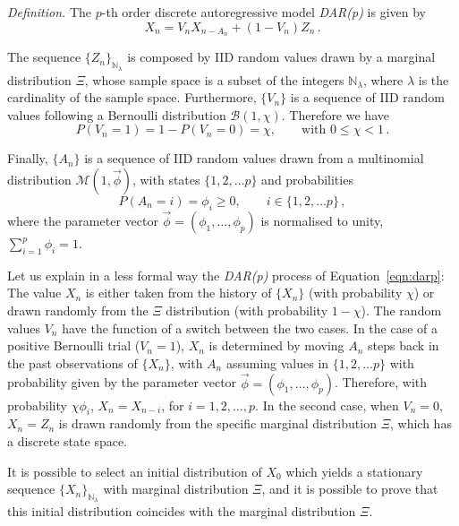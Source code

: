 \documentclass[12pt]{iopart}
\begin{document}
{\it Definition.}
The $p$-th order discrete autoregressive model \textit{DAR(p)} is given by
\begin{equation}
X_n=V_nX_{n-A_n}+(1-V_n)Z_n \label{eqn:darp}\,.
\end{equation}

The sequence $\lbrace Z_n \rbrace_{\mathbb{N}_\lambda}$ is composed by IID random values drawn by a marginal distribution $\Xi$, whose sample space is a subset of the integers $\mathbb{N}_\lambda$, where $\lambda$ is the cardinality of the sample space. Furthermore, $\lbrace V_n \rbrace$ is a sequence of IID random values following a Bernoulli distribution $\mathcal{B}(1,\chi)$. Therefore we have
\begin{equation*}
P(V_n=1)=1-P(V_n=0)=\chi, \qquad \mbox{with } 0 \leqslant \chi < 1\,.
\end{equation*}

Finally, $\lbrace A_n \rbrace$ is a sequence of IID random values drawn from a multinomial distribution $\mathcal{M}(1,\vec{\phi})$, with states $\lbrace 1,2, \ldots p \rbrace$ and probabilities
\begin{equation*}
P(A_n=i)=\phi_i\geqslant0, \qquad i \in \lbrace 1,2, \ldots p \rbrace\,,
\end{equation*}
where the parameter vector $\vec{\phi}=(\phi_1,\ldots,\phi_p)$ is normalised to unity, $\sum_{i=1}^p \phi_i=1$.

Let us explain in a less formal way the \textit{DAR(p)} process of Equation~\ref{eqn:darp}: The value $X_n$ is either taken from the history of $\lbrace X_n \rbrace$ (with probability $\chi$) or drawn randomly from the $\Xi$ distribution (with probability $1-\chi$). The random values $V_n$ have the function of a switch between the two cases. In the case of a positive Bernoulli trial ($V_n=1$), $X_n$ is determined by moving $A_n$ steps back in the past observations of $\lbrace X_n \rbrace$, with $A_n$ assuming values in $\lbrace 1,2, \ldots p \rbrace$ with probability given by the parameter vector $\vec{\phi}=(\phi_1,\ldots,\phi_p)$. Therefore, with probability $\chi \phi_i$, $X_n=X_{n-i}$, for $i=1,2,\ldots,p$. In the second case, when $V_n=0$, $X_n=Z_n$ is drawn randomly from the specific marginal distribution $\Xi$, which has a discrete state space.

It is possible to select an initial distribution of $X_0$ which yields a stationary sequence $\lbrace X_n \rbrace_{\mathbb{N}_\lambda}$ with marginal distribution $\Xi$, and it is possible to prove that this initial distribution coincides with the marginal distribution $\Xi$.
\end{document}
